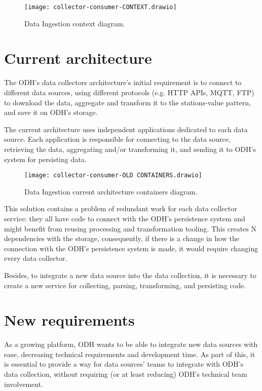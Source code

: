 \begin{figure}
    \centering
    \texttt{[image: collector-consumer-CONTEXT.drawio]}
    \caption{Data Ingestion context diagram.\label{fig:subfigures9}}
\end{figure}

\section{Current architecture}
\label{sec:current}

The ODH's data collectors architecture's initial requirement is to connect to different data sources, using different protocols (e.g. HTTP APIs, MQTT, FTP) to download the data, aggregate and transform it to the stations-value pattern, and save it on ODH’s storage.

The current architecture uses independent applications dedicated to each data source. Each application is responsible for connecting to the data source, retrieving the data, aggregating and/or transforming it, and sending it to ODH's system for persisting data.

\begin{figure}
    \centering
    \texttt{[image: collector-consumer-OLD CONTAINERS.drawio]}
    \caption{Data Ingestion current architecture containers diagram.\label{fig:subfigures10}}
\end{figure}

This solution contains a problem of redundant work for each data collector service: they all have code to connect with the ODH's persistence system and might benefit from reusing processing and transformation tooling. This creates N dependencies with the storage, consequently, if there is a change in how the connection with the ODH's persistence system is made, it would require changing every data collector.

Besides, to integrate a new data source into the data collection, it is necessary to create a new service for collecting, parsing, transforming, and persisting code.

\section{New requirements}
\label{sec:requirements}

As a growing platform, ODH wants to be able to integrate new data sources with ease, decreasing technical requirements and development time. As part of this, it is essential to provide a way for data sources' teams to integrate with ODH's data collection, without requiring (or at least reducing) ODH's technical team involvement.

